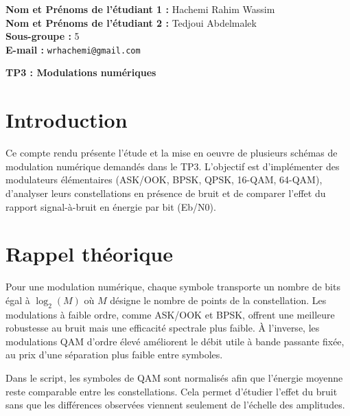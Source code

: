 \documentclass[11pt,a4paper,twocolumn]{article}
\begin{document}
\begin{titlepage}
    \vspace{2.5cm}

    \begin{flushleft}
        \Large
        \textbf{Nom et Prénoms de l'étudiant 1 :} Hachemi Rahim Wassim\\[0.4cm]
        \textbf{Nom et Prénoms de l'étudiant 2 :} Tedjoui Abdelmalek\\[0.4cm]
        \textbf{Sous-groupe :} 5\\[0.4cm]
        \textbf{E-mail :} \texttt{wrhachemi@gmail.com}
    \end{flushleft}

\end{titlepage}

\vspace*{0.3cm}
\begin{center}
\textbf{\large TP3 : Modulations numériques}
\end{center}

\section*{Introduction}
Ce compte rendu présente l'étude et la mise en oeuvre de plusieurs schémas de modulation numérique demandés dans le TP3. L'objectif est d'implémenter des modulateurs élémentaires (ASK/OOK, BPSK, QPSK, 16-QAM, 64-QAM), d'analyser leurs constellations en présence de bruit et de comparer l'effet du rapport signal-à-bruit en énergie par bit (Eb/N0).

\section*{Rappel théorique}
Pour une modulation numérique, chaque symbole transporte un nombre de bits égal à $\log_2(M)$ où $M$ désigne le nombre de points de la constellation. Les modulations à faible ordre, comme ASK/OOK et BPSK, offrent une meilleure robustesse au bruit mais une efficacité spectrale plus faible. À l'inverse, les modulations QAM d'ordre élevé améliorent le débit utile à bande passante fixée, au prix d'une séparation plus faible entre symboles.

Dans le script, les symboles de QAM sont normalisés afin que l'énergie moyenne reste comparable entre les constellations. Cela permet d'étudier l'effet du bruit sans que les différences observées viennent seulement de l'échelle des amplitudes.
\end{document}
